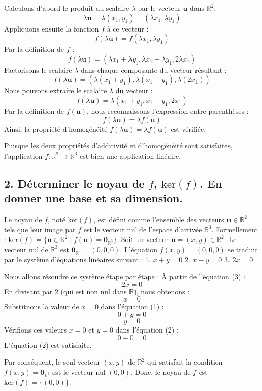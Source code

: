 \documentclass{report}
\begin{document}
Calculons d'abord le produit du scalaire $\lambda$ par le vecteur $\mathbf{u}$ dans $\mathbb{R}^2$:
$$\lambda \mathbf{u} = \lambda (x_1, y_1) = (\lambda x_1, \lambda y_1)$$
Appliquons ensuite la fonction $f$ à ce vecteur :
$$f(\lambda \mathbf{u}) = f(\lambda x_1, \lambda y_1)$$
Par la définition de $f$ :
$$f(\lambda \mathbf{u}) = (\lambda x_1 + \lambda y_1, \lambda x_1 - \lambda y_1, 2\lambda x_1)$$
Factorisons le scalaire $\lambda$ dans chaque composante du vecteur résultant :
$$f(\lambda \mathbf{u}) = (\lambda(x_1 + y_1), \lambda(x_1 - y_1), \lambda(2x_1))$$
Nous pouvons extraire le scalaire $\lambda$ du vecteur :
$$f(\lambda \mathbf{u}) = \lambda(x_1 + y_1, x_1 - y_1, 2x_1)$$
Par la définition de $f(\mathbf{u})$, nous reconnaissons l'expression entre parenthèses :
$$f(\lambda \mathbf{u}) = \lambda f(\mathbf{u})$$
Ainsi, la propriété d'homogénéité $f(\lambda \mathbf{u}) = \lambda f(\mathbf{u})$ est vérifiée.

Puisque les deux propriétés d'additivité et d'homogénéité sont satisfaites, l'application $f: \mathbb{R}^2 \to \mathbb{R}^3$ est bien une application linéaire.

\subsection*{2. Déterminer le noyau de $f$, $\text{ker}(f)$. En donner une base et sa dimension.}

Le noyau de $f$, noté $\text{ker}(f)$, est défini comme l'ensemble des vecteurs $\mathbf{u} \in \mathbb{R}^2$ tels que leur image par $f$ est le vecteur nul de l'espace d'arrivée $\mathbb{R}^3$.
Formellement : $\text{ker}(f) = \{ \mathbf{u} \in \mathbb{R}^2 \mid f(\mathbf{u}) = \mathbf{0}_{\mathbb{R}^3} \}$.
Soit un vecteur $\mathbf{u} = (x, y) \in \mathbb{R}^2$. Le vecteur nul de $\mathbb{R}^3$ est $\mathbf{0}_{\mathbb{R}^3} = (0, 0, 0)$.
L'équation $f(x, y) = (0, 0, 0)$ se traduit par le système d'équations linéaires suivant :
1.  $x+y = 0$
2.  $x-y = 0$
3.  $2x = 0$

Nous allons résoudre ce système étape par étape :
À partir de l'équation (3) :
$$2x = 0$$
En divisant par 2 (qui est non nul dans $\mathbb{R}$), nous obtenons :
$$x = 0$$
Substituons la valeur de $x=0$ dans l'équation (1) :
$$0+y = 0$$
$$y = 0$$
Vérifions ces valeurs $x=0$ et $y=0$ dans l'équation (2) :
$$0-0 = 0$$
L'équation (2) est satisfaite.

Par conséquent, le seul vecteur $(x, y)$ de $\mathbb{R}^2$ qui satisfait la condition $f(x, y) = \mathbf{0}_{\mathbb{R}^3}$ est le vecteur nul $(0, 0)$.
Donc, le noyau de $f$ est $\text{ker}(f) = \{ (0, 0) \}$.
\end{document}
